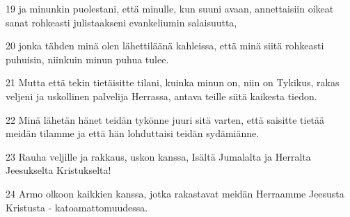 \par 19 ja minunkin puolestani, että minulle, kun suuni avaan, annettaisiin oikeat sanat rohkeasti julistaakseni evankeliumin salaisuutta,
\par 20 jonka tähden minä olen lähettiläänä kahleissa, että minä siitä rohkeasti puhuisin, niinkuin minun puhua tulee.
\par 21 Mutta että tekin tietäisitte tilani, kuinka minun on, niin on Tykikus, rakas veljeni ja uskollinen palvelija Herrassa, antava teille siitä kaikesta tiedon.
\par 22 Minä lähetän hänet teidän tykönne juuri sitä varten, että saisitte tietää meidän tilamme ja että hän lohduttaisi teidän sydämiänne.
\par 23 Rauha veljille ja rakkaus, uskon kanssa, Isältä Jumalalta ja Herralta Jeesukselta Kristukselta!
\par 24 Armo olkoon kaikkien kanssa, jotka rakastavat meidän Herraamme Jeesusta Kristusta - katoamattomuudessa.


